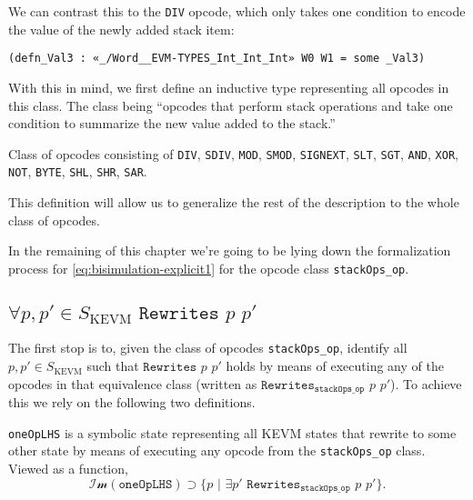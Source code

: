 We can contrast this to the \texttt{DIV} opcode, which only takes one condition
to encode the value of the newly added stack item:
\begin{verbatim}
(defn_Val3 : «_/Word__EVM-TYPES_Int_Int_Int» W0 W1 = some _Val3)
\end{verbatim}

With this in mind, we first define an inductive type representing all opcodes in
this class. The class being ``opcodes that perform stack operations and take one
condition to summarize the new value added to the stack.''

\begin{definition}[stackOps_op]\label{def:OneOp.stackOps}
\leanok
Class of opcodes consisting of
\texttt{DIV}, \texttt{SDIV}, \texttt{MOD}, \texttt{SMOD}, \texttt{SIGNEXT},
\texttt{SLT}, \texttt{SGT}, \texttt{AND}, \texttt{XOR}, \texttt{NOT},
\texttt{BYTE}, \texttt{SHL}, \texttt{SHR}, \texttt{SAR}.
\end{definition}

This definition will allow us to generalize the rest of the description to the
whole class of opcodes.

In the remaining of this chapter we're going to be lying down the formalization
process for \ref{eq:bisimulation-explicit1} for the opcode class
\texttt{stackOps_op}.

\subsection{$\forall p, p'\in S_{\text{KEVM}}\,\, \texttt{Rewrites}\,\, p \,\, p'$}

The first stop is to, given the class of opcodes \texttt{stackOps_op},
identify all $p, p'\in S_{\text{KEVM}}$ such that $\texttt{Rewrites}\,\, p \,\,
p'$ holds by means of executing any of the opcodes in that equivalence class
(written as $\texttt{Rewrites}_{\texttt{stackOps_op}}\,\, p \,\, p'$).
To achieve this we rely on the following two definitions.

\begin{definition}[oneOpLHS]\label{def:oneOpLHS}
\leanok{}

\texttt{oneOpLHS} is a symbolic state representing all KEVM states that
rewrite to some other state by means of executing any opcode from the
\texttt{stackOps_op} class. Viewed as a
function, $$\mathcal{Im}(\texttt{oneOpLHS}) \supset \{p\,\, |\,\, \exists
p'\,\,\texttt{Rewrites}_{\texttt{stackOps_op}}\,\, p \,\, p'\}.$$

\end{definition}

